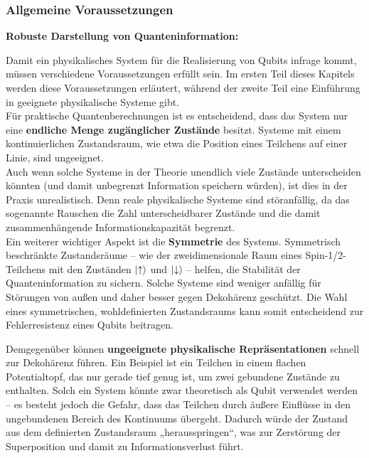 \subsubsection{Allgemeine Voraussetzungen}

\textbf{Robuste Darstellung von Quanteninformation:}

Damit ein physikalisches System für die Realisierung von Qubits infrage kommt, müssen verschiedene Voraussetzungen erfüllt sein. Im ersten Teil dieses Kapitels werden diese Voraussetzungen erläutert, während der zweite Teil eine Einführung in geeignete physikalische Systeme gibt.\\
 

Für praktische Quantenberechnungen ist es entscheidend, dass das System nur eine \textbf{endliche Menge zugänglicher Zustände} besitzt. Systeme mit einem kontinuierlichen Zustandsraum, wie etwa die Position eines Teilchens auf einer Linie, sind ungeeignet. \\
Auch wenn solche Systeme in der Theorie unendlich viele Zustände unterscheiden könnten (und damit unbegrenzt Information speichern würden), ist dies in der Praxis unrealistisch. Denn reale physikalische Systeme sind störanfällig, da das sogenannte Rauschen die Zahl unterscheidbarer Zustände und die damit zusammenhängende Informationskapazität begrenzt. \\

Ein weiterer wichtiger Aspekt ist die \textbf{Symmetrie} des Systems. Symmetrisch beschränkte Zustandsräume – wie der zweidimensionale Raum eines Spin-1/2-Teilchens mit den Zuständen $\ket{\uparrow}$ und $\ket{\downarrow}$ – helfen, die Stabilität der Quanteninformation zu sichern. Solche Systeme sind weniger anfällig für Störungen von außen und daher besser gegen Dekohärenz geschützt. Die Wahl eines symmetrischen, wohldefinierten Zustandsraums kann somit entscheidend zur Fehlerresistenz eines Qubits beitragen.

Demgegenüber können \textbf{ungeeignete physikalische Repräsentationen} schnell zur Dekohärenz führen. Ein Beispiel ist ein Teilchen in einem flachen Potentialtopf, das nur gerade tief genug ist, um zwei gebundene Zustände zu enthalten. Solch ein System könnte zwar theoretisch als Qubit verwendet werden – es besteht jedoch die Gefahr, dass das Teilchen durch äußere Einflüsse in den ungebundenen Bereich des Kontinuums übergeht. Dadurch würde der Zustand aus dem definierten Zustandsraum „herausspringen“, was zur Zerstörung der Superposition und damit zu Informationsverlust führt.\\

